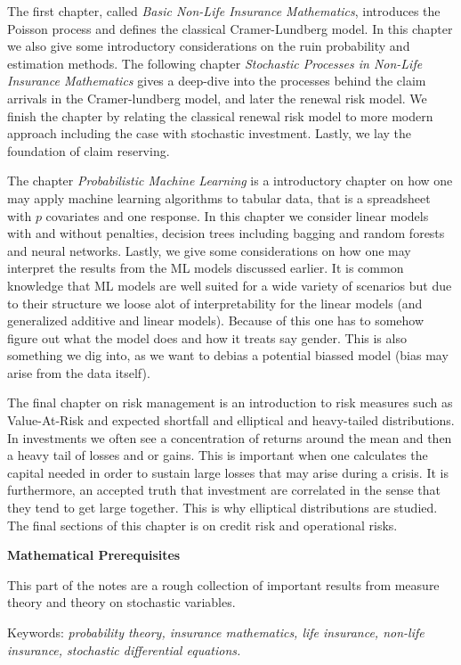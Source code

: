 \documentclass[a4paper,12pt,openany]{book}
\begin{document}
The first chapter, called \emph{Basic Non-Life Insurance Mathematics}, introduces the Poisson process and defines the classical Cramer-Lundberg model. In this chapter we also give some introductory considerations on the ruin probability and estimation methods. The following chapter \emph{Stochastic Processes in Non-Life Insurance Mathematics} gives a deep-dive into the processes behind the claim arrivals in the Cramer-lundberg model, and later the renewal risk model. We finish the chapter by relating the classical renewal risk model to more modern approach including the case with stochastic investment. Lastly, we lay the foundation of claim reserving.

The chapter \emph{Probabilistic Machine Learning} is a introductory chapter on how one may apply machine learning algorithms to tabular data, that is a spreadsheet with \(p\) covariates and one response. In this chapter we consider linear models with and without penalties, decision trees including bagging and random forests and neural networks. Lastly, we give some considerations on how one may interpret the results from the ML models discussed earlier. It is common knowledge that ML models are well suited for a wide variety of scenarios but due to their structure we loose alot of interpretability for the linear models (and generalized additive and linear models). Because of this one has to somehow figure out what the model does and how it treats say gender. This is also something we dig into, as we want to debias a potential biassed model (bias may arise from the data itself).

The final chapter on risk management is an introduction to risk measures such as Value-At-Risk and expected shortfall and elliptical and heavy-tailed distributions. In investments we often see a concentration of returns around the mean and then a heavy tail of losses and or gains. This is important when one calculates the capital needed in order to sustain large losses that may arise during a crisis. It is furthermore, an accepted truth that investment are correlated in the sense that they tend to get large together. This is why elliptical distributions are studied. The final sections of this chapter is on credit risk and operational risks.

\textbf{Mathematical Prerequisites}

This part of the notes are a rough collection of important results from measure theory and theory on stochastic variables.

\vspace{5pt}
\noindent Keywords: \emph{probability theory, insurance mathematics, life insurance, non-life insurance, stochastic differential equations.}
\end{document}
